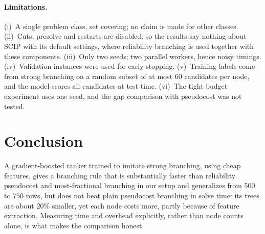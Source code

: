 \documentclass[11pt,a4paper]{article}
\begin{document}
\paragraph{Limitations.} (i)~A single problem class, set covering; no claim is made for other classes. (ii)~Cuts, presolve and restarts are disabled, so the results say nothing about SCIP with its default settings, where reliability branching is used together with these components. (iii)~Only two seeds; two parallel workers, hence noisy timings. (iv)~Validation instances were used for early stopping. (v)~Training labels come from strong branching on a random subset of at most $60$ candidates per node, and the model scores all candidates at test time. (vi)~The tight-budget experiment uses one seed, and the gap comparison with pseudocost was not tested.
 
\section{Conclusion}
A gradient-boosted ranker trained to imitate strong branching, using cheap features, gives a branching rule that is substantially faster than reliability pseudocost and most-fractional branching in our setup and generalizes from $500$ to $750$ rows, but does not beat plain pseudocost branching in solve time: its trees are about $20\%$ smaller, yet each node costs more, partly because of feature extraction. Measuring time and overhead explicitly, rather than node counts alone, is what makes the comparison honest.
 


 
\end{document}
